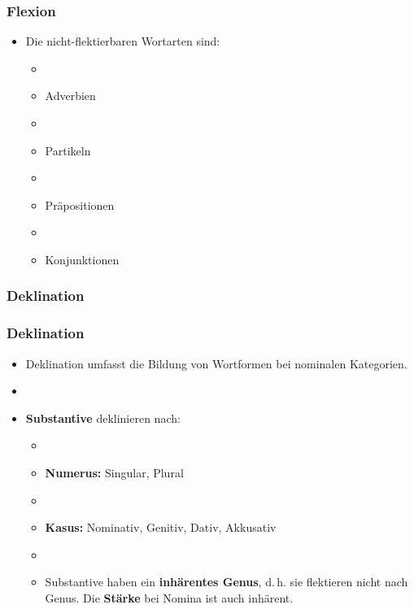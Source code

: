
\begin{frame}
\frametitle{Flexion}

\begin{itemize}
	\item Die nicht-flektierbaren Wortarten sind:
	
	\begin{itemize}
		\item[]
		\item Adverbien
		\item[]
		\item Partikeln
		\item[]
		\item Präpositionen
		\item[]
		\item Konjunktionen
	\end{itemize}
\end{itemize}


\end{frame}




\subsubsection{Deklination}



\begin{frame}
\frametitle{Deklination}

\begin{itemize}
	\item Deklination umfasst die Bildung von Wortformen bei nominalen Kategorien.
	\item[]
	\item \textbf{Substantive} deklinieren nach:
	
	\begin{itemize}
		\item[]
		\item \textbf{Numerus:} Singular, Plural
		\item[]
		\item \textbf{Kasus:} Nominativ, Genitiv, Dativ, Akkusativ
		\item[]
		\item Substantive haben ein \textbf{inhärentes Genus}, d.\,h. sie flektieren nicht nach Genus. Die \textbf{Stärke} bei Nomina ist auch inhärent.
	\end{itemize}
	
\end{itemize}

\end{frame}



